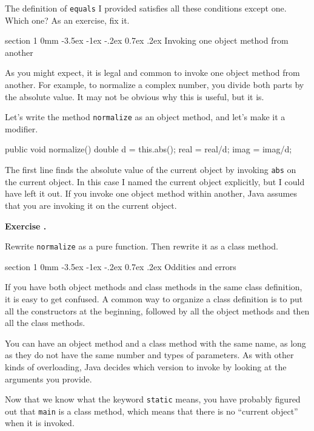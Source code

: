 \documentclass{book}
\makeatletter
\newcounter{exercisenum}
\renewcommand{\theexercisenum}{{\thechapter}.\arabic{exercisenum}}
\newenvironment{exercisesize}{\begin{small}}{\end{small}}
\newcommand{\exerciseheader}[2]{                                          
     
  \begin{exercisesize}                                                    
     
     
  \def\theenumi{\alph{enumi}}                                             
  \def\labelenumi{\theenumi.}                                             
  \def\theenumii{\roman{enumii}}                                          
  \def\labelenumii{\theenumii.}                                           
  {\bf Exercise {#1}{#2}}\hspace{0.1in}                 
}
\newcommand{\startexercise}[1]{%
  \refstepcounter{exercisenum}                                            
  \exerciseheader{\theexercisenum}{#1}                                    
}
\newcommand{\stopexercise}{%
  {\hfill}                                                               
  \end{exercisesize}      
}
\newcommand{\normaldif}{}
\newenvironment{exercise}{\startexercise{\normaldif{}}}{\stopexercise}
\renewcommand{\section}{\@startsection 
    {section} {1} {0mm}%
    {-3.5ex \@plus -1ex \@minus -.2ex}%
    {0.7ex \@plus.2ex}%
    {\normalfont\Large\bfseries}}
\makeatother
\begin{document}
The definition of {\tt equals} I provided satisfies all these
conditions except one.  Which one?  As an exercise, fix it.


\section{Invoking one object method from another}

As you might expect, it is legal and common to invoke
one object method from another.  For example, to normalize a
complex number, you divide both parts by the absolute
value.  It may not be obvious why this is useful, but it is.

Let's write the method {\tt normalize} as an object method, and
let's make it a modifier.

\begin{verbatimtab}
public void normalize() {
    double d = this.abs();
    real = real/d;
    imag = imag/d;
}
\end{verbatimtab}
%
The first line finds the absolute value of the current object
by invoking {\tt abs} on the current object.  In this case
I named the current object explicitly, but I could have left
it out.  If you invoke one object method within another, Java
assumes that you are invoking it on the current object.

\begin{exercise}
Rewrite {\tt normalize} as a pure function. 
Then rewrite it as a class method.
\end{exercise}


\section{Oddities and errors}

If you have both object methods and class methods in the same class
definition, it is easy to get confused.  A common way to organize a
class definition is to put all the constructors at the beginning,
followed by all the object methods and then all the class methods.

You can have an object method and a class method with the same
name, as long as they do not have the same number and types of
parameters.  As with other kinds of overloading, Java decides
which version to invoke by looking at the arguments you provide.


Now that we know what the keyword {\tt static} means, you
have probably figured out that {\tt main} is a class method,
which means that there is no ``current object'' when it is invoked.
\end{document}
